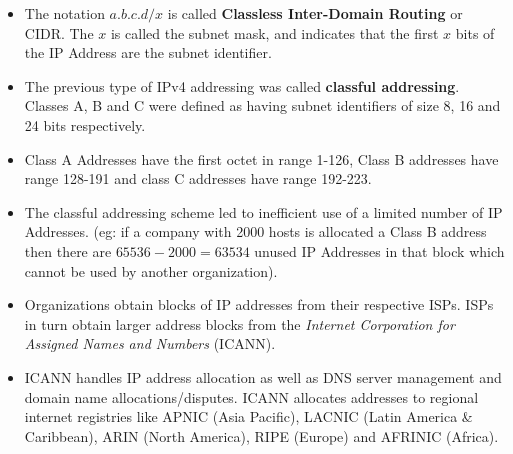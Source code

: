 \documentclass[a4paper]{article}
\theoremstyle{plain}
\theoremstyle{definition}
\begin{document}
\begin{itemize}
    \item The notation $a.b.c.d/x$ is called \textbf{Classless Inter-Domain Routing} or CIDR. The $x$ is called the subnet mask, and indicates that the first $x$ bits of the IP Address are the subnet identifier. 
    
    \item The previous type of IPv4 addressing was called \textbf{classful addressing}. Classes A, B and C were defined as having subnet identifiers of size 8, 16 and 24 bits respectively. 
    
    \item Class A Addresses have the first octet in range 1-126, Class B addresses have range 128-191 and class C addresses have range 192-223. 
    
    \item The classful addressing scheme led to inefficient use of a limited number of IP Addresses. (eg: if a company with 2000 hosts is allocated a Class B address then there are $65536-2000 =  63534$ unused IP Addresses in that block which cannot be used by another organization). 
    
    \item Organizations obtain blocks of IP addresses from their respective ISPs. ISPs in turn obtain larger address blocks from the \textit{Internet Corporation for Assigned Names and Numbers} (ICANN). 
    
    \item ICANN handles IP address allocation as well as DNS server management and domain name allocations/disputes. ICANN allocates addresses to regional internet registries like APNIC (Asia Pacific), LACNIC (Latin America \& Caribbean), ARIN (North America), RIPE (Europe) and AFRINIC (Africa).  
    
\end{itemize}
\end{document}
